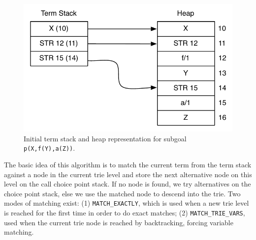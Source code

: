 \begin{figure}[ht]
  \centering
    \includegraphics[scale=0.6]{lookup_subgoal_termstack_start.pdf}
  \caption{Initial term stack and heap representation for subgoal \texttt{p(X,f(Y),a(Z))}.}
  \label{fig:lookup_subgoal_termstack_start}
\end{figure}

The basic idea of this algorithm is to match the current term from the term stack against a node in the current
trie level and store the next alternative node on this level on the call choice point stack. If no node
is found, we try alternatives on the choice point stack, else we use the matched node to descend into the trie.
Two modes of matching exist: (1) \texttt{MATCH\_EXACTLY}, which is used when a new trie level is reached for the
first time in order to do exact matches; (2) \texttt{MATCH\_TRIE\_VARS}, used when the current trie node is reached
by backtracking, forcing variable matching.

